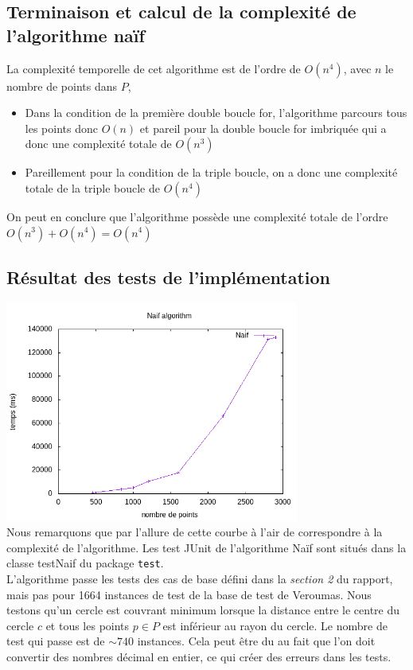 \documentclass[12pt, a4paper, titlepage]{article}
\begin{document}
    \subsection{Terminaison et calcul de la complexité de l'algorithme naïf}
    La complexité temporelle de cet algorithme est de l'ordre de $O(n^{4})$, avec $n$ le nombre de points dans $P$,
    \begin{itemize}
        \item Dans la condition de la première double boucle for, l'algorithme parcours tous les points donc $O(n)$ et pareil pour la double boucle for imbriquée qui a donc une complexité totale de $O(n^{3})$
        \item Pareillement pour la condition de la triple boucle, on a donc une complexité totale de la triple boucle de  $O(n^{4})$ 
    \end{itemize}
    On peut en conclure que l'algorithme possède une complexité totale de l'ordre $O(n^{3})+O(n^{4}) = O(n^{4})$

    \subsection{Résultat des tests de l'implémentation}
    \includegraphics[width=365px,
                     keepaspectratio,]{NaifPoints.png}\\
    Nous remarquons que par l'allure de cette courbe à l'air de correspondre à la complexité de l'algorithme.
    Les test JUnit de l'algorithme Naïf sont situés dans la classe testNaif du package \texttt{test}.\\
    L'algorithme passe les tests des cas de base défini dans la \textit{section 2} du rapport, mais pas pour 1664 instances de test de la base de test de Veroumas. Nous testons qu'un cercle est couvrant minimum lorsque la distance entre le centre du cercle $c$ et tous les points $p \in P$ est inférieur au rayon du cercle. Le nombre de test qui passe est de $\sim740$ instances. Cela peut être du au fait que l'on doit convertir des nombres décimal en entier, ce qui créer des erreurs dans les tests. \\
    
\end{document}
